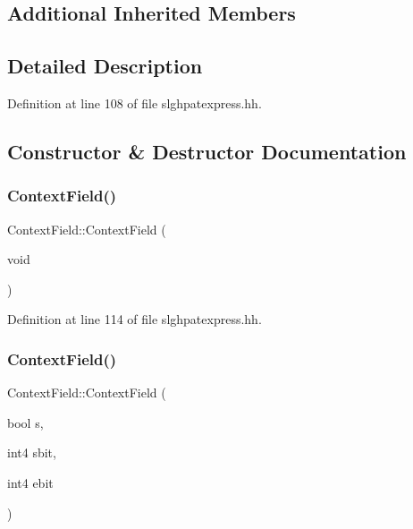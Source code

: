 \subsection*{Additional Inherited Members}


\subsection{Detailed Description}


Definition at line 108 of file slghpatexpress.\+hh.



\subsection{Constructor \& Destructor Documentation}
\mbox{\label{class_context_field_a87676c92e1697af7859cb1ae623c215c}} 
\subsubsection{\texorpdfstring{ContextField()}{ContextField()}\hspace{0.1cm}{\footnotesize\ttfamily [1/2]}}
{\footnotesize\ttfamily Context\+Field\+::\+Context\+Field (\begin{DoxyParamCaption}\item[{void}]{ }\end{DoxyParamCaption})\hspace{0.3cm}{\ttfamily [inline]}}



Definition at line 114 of file slghpatexpress.\+hh.

\mbox{\label{class_context_field_affb58e313cc01057dc7e5d1d7c50ea6d}} 
\subsubsection{\texorpdfstring{ContextField()}{ContextField()}\hspace{0.1cm}{\footnotesize\ttfamily [2/2]}}
{\footnotesize\ttfamily Context\+Field\+::\+Context\+Field (\begin{DoxyParamCaption}\item[{bool}]{s,  }\item[{int4}]{sbit,  }\item[{int4}]{ebit }\end{DoxyParamCaption})}



